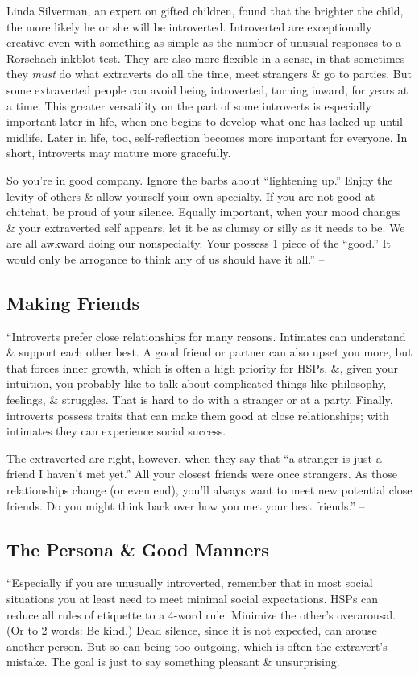 \documentclass{article}
\numberwithin{equation}{section}
\begin{document}
Linda Silverman, an expert on gifted children, found that the brighter the child, the more likely he or she will be introverted. Introverted are exceptionally creative even with something as simple as the number of unusual responses to a Rorschach inkblot test. They are also more flexible in a sense, in that sometimes they \textit{must} do what extraverts do all the time, meet strangers \& go to parties. But some extraverted people can avoid being introverted, turning inward, for years at a time. This greater versatility on the part of some introverts is especially important later in life, when one begins to develop what one has lacked up until midlife. Later in life, too, self-reflection becomes more important for everyone. In short, introverts may mature more gracefully.

So you're in good company. Ignore the barbs about ``lightening up.'' Enjoy the levity of others \& allow yourself your own specialty. If you are not good at chitchat, be proud of your silence. Equally important, when your mood changes \& your extraverted self appears, let it be as clumsy or silly as it needs to be. We are all awkward doing our nonspecialty. Your possess 1 piece of the ``good.'' It would only be arrogance to think any of us should have it all.'' -- \cite[pp. 132--133]{Aron2013}

\subsection{Making Friends}
``Introverts prefer close relationships for many reasons. Intimates can understand \& support each other best. A good friend or partner can also upset you more, but that forces inner growth, which is often a high priority for HSPs. \&, given your intuition, you probably like to talk about complicated things like philosophy, feelings, \& struggles. That is hard to do with a stranger or at a party. Finally, introverts possess traits that can make them good at close relationships; with intimates they can experience social success.

The extraverted are right, however, when they say that ``a stranger is just a friend I haven't met yet.'' All your closest friends were once strangers. As those relationships change (or even end), you'll always want to meet new potential close friends. Do you might think back over how you met your best friends.'' -- \cite[p. 133]{Aron2013}

\subsection{The Persona \& Good Manners}
``Especially if you are unusually introverted, remember that in most social situations you at least need to meet minimal social expectations. HSPs can reduce all rules of etiquette to a 4-word rule: Minimize the other's overarousal. (Or to 2 words: Be kind.) Dead silence, since it is not expected, can arouse another person. But so can being too outgoing, which is often the extravert's mistake. The goal is just to say something pleasant \& unsurprising.
\end{document}
